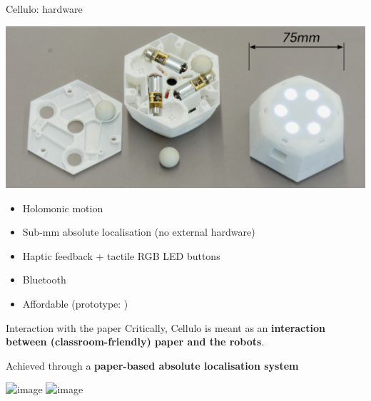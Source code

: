 \documentclass[handout,compress]{beamer}
\begin{document}
 \begin{frame}{Cellulo: hardware}
     \begin{center}
         \includegraphics[width=0.8\linewidth]{cellulo/hardware-design}
     \end{center}
     \begin{itemize}
         \item Holomonic motion
         \item Sub-mm absolute localisation (no external hardware)
         \item Haptic feedback + tactile RGB LED buttons 
         \item Bluetooth
         \item<2> Affordable (prototype: )
     \end{itemize}
 \end{frame}




{
 \begin{frame}{Interaction with the paper}
     Critically, Cellulo is meant as an {\bf interaction between
     (classroom-friendly) paper and the robots}.

     \pause

     Achieved through a {\bf paper-based absolute localisation system}

     \begin{center}
         \includegraphics<3>[width=0.8\linewidth]{cellulo/treasure-game-1}
         \includegraphics<4>[width=\linewidth]{cellulo/treasure-game-2}
     \end{center}


 \end{frame}
}
\end{document}
